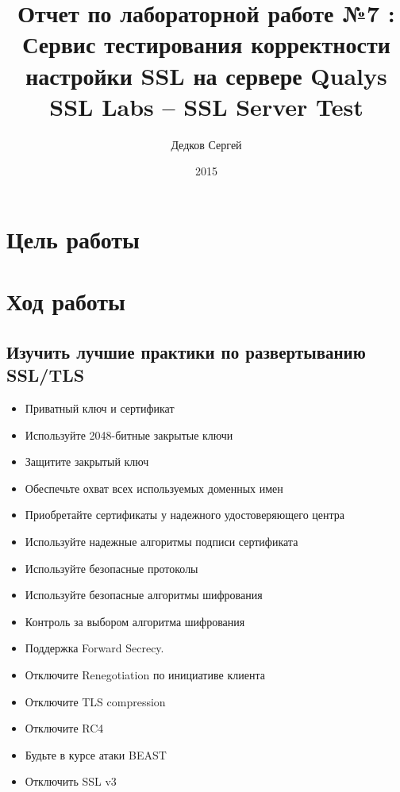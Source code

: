 \documentclass[11pt, a4paper]{article}		%
\author{Дедков Сергей}
\title{Отчет по лабораторной работе №7 :\\ Сервис тестирования корректности настройки SSL на сервере Qualys SSL Labs – SSL Server Test}
\date{2015}
\begin{document}
\maketitle
\tableofcontents
\newpage



\section{Цель работы}



\section{Ход работы}



\subsection{Изучить лучшие практики по развертыванию SSL/TLS}

\begin{itemize}

\item Приватный ключ и сертификат

\item Используйте 2048-битные закрытые ключи

\item Защитите закрытый ключ

\item Обеспечьте охват всех используемых доменных имен

\item Приобретайте сертификаты у надежного удостоверяющего центра

\item Используйте надежные алгоритмы подписи сертификата

\item Используйте безопасные протоколы

\item Используйте безопасные алгоритмы шифрования

\item Контроль за выбором алгоритма шифрования

\item Поддержка Forward Secrecy.

\item Отключите Renegotiation по инициативе клиента

\item Отключите TLS compression

\item Отключите RC4

\item Будьте в курсе атаки BEAST

\item Отключить SSL v3

\end{itemize}
\end{document}
